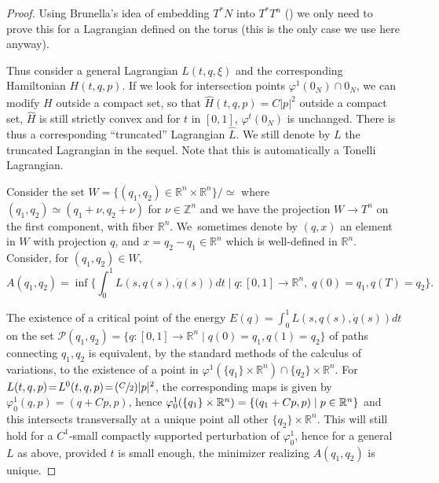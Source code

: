 \documentclass[JEP,XML,SOM,NoFloatCountersInSection,Unicode,published]{cedram}
\let\ra\rightarrow
\newcommand{\Psfrac}[2]{(\sfrac{#1}{#2})}
\numberwithin{equation}{section}
\theoremstyle{plain}
\theoremstyle{definition}
\theoremstyle{remark}
\begin{document}
\begin{proof} Using Brunella's idea of embedding $T^{*}N$ into $T^{*} T^{n}$ (\cf \cite{Brunella}) we only need to prove this for a Lagrangian defined on the torus (this is the only case we use here anyway).

Thus consider a general Lagrangian $L(t,q,\xi)$ and the corresponding Hamiltonian $H(t,q,p)$. If we look for intersection points $\varphi_{}^{1}(0_{N})\cap 0_{N}$, we can modify $ H$ outside a compact set, so that $\widehat H(t,q,p)= C\vert p \vert ^{2}$ outside a compact set, $\widehat H$ is still strictly convex and for $t$ in $[0,1]$, $\varphi^{t}(0_{N})$ is unchanged. There is thus a corresponding ``truncated'' Lagrangian $\widehat L$. We still denote by $L$ the truncated Lagrangian in the sequel. Note that this is automatically a Tonelli Lagrangian.

Consider the set $W=\{(q_{1},q_{2}) \in {\mathbb R}^{n}\times {\mathbb R}^{n}\}/\simeq $ where $(q_{1},q_{2})\simeq (q_{1}+\nu, q_{2}+\nu)$ for $ \nu \in {\mathbb Z}^{n}$
and we have the projection $W \to T^{n}$ on the first component, with fiber $ {\mathbb R} ^{n}$. We~some\-times denote by $(q,x)$ an element in $W$ with projection $q$,
and \hbox{$x\!=\!q_{2}-q_{1}\!\in\! {\mathbb R}^{n}$} which is well-defined in $ {\mathbb R} ^{n}$.
Consider, for $(q_{1},q_{2}) \in W$,
\[
A(q_{1},q_{2})=\inf \biggl \{\int_{0}^{1}L(s,q(s),\dot q(s)) dt \mid q:[0,1] \ra {\mathbb R}^{n},\; q(0)=q_{1}, q(T)=q_{2}\biggr\}.
\]

The existence of a critical point of the energy $E(q)=\int_{0}^{1}L(s,q(s),\dot q(s)) dt $ on the set $\mathcal P(q_{1},q_{2})=\{ q:[0,1] \to {\mathbb R}^{n} \mid q(0)=q_{1}, q(1)=q_{2}\}$ of paths connecting $q_{1}, q_{2}$ is equivalent, by the standard methods of the calculus of variations, to the existence of a point in $\varphi^{1}(\{q_{1}\}\!\times\! {\mathbb R} ^{n}) \cap \{q_{2}\}\times {\mathbb R} ^{n}$. For $L(t,q,p)\!=\!L^{0}(t,q,p)\!=\!\Psfrac{C}{2} \vert p \vert ^{2}$, the corresponding maps is given by $\varphi_{0}^{1}(q,p)=(q+Cp,p)$, hence $\varphi_{0}^{1}(\{q_{1}\}\times {\mathbb R} ^{n})=\{ (q_{1}+\nobreak Cp,p) \mid p \in {\mathbb R}^{n}\}$ and this intersects transversally at a unique point all other $\{q_{2}\}\times {\mathbb R} ^{n}$. This will still
hold for a $C^{1}$-small compactly supported perturbation of $\varphi_{0}^{1}$, hence for a general $L$ as above, provided $t$ is small enough, the
minimizer realizing $A(q_{1},q_{2})$ is unique.


\end{proof}
\end{document}
